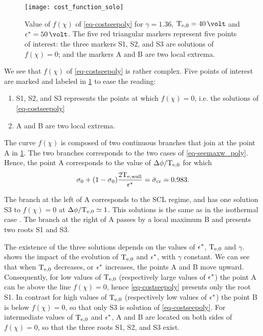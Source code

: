 \begin{figure}[!hbt]
  \centering
  \texttt{[image: cost\_function\_solo]}
  \caption{Value of $f(\chi)$ of \cref{eq-costseepoly} for $\gamma = 1.36$, $\Teb=40\,\volt$ and $\crover=50\,\volt$. The five red triangular markers represent five points of interest\string: the three markers S1, S2, and S3 are solutions of $f(\chi) = 0$; and the markers A and B are two local extrema. }
  \label{fig-costfunction}
\end{figure}

We see that $f(\chi)$ of \cref{eq-costseepoly} is rather complex.
Five points of interest are marked and labeled in \cref{fig-costfunction} to ease the reading\string: 
\begin{enumerate}
  \item S1, S2, and S3 represents the points at which $f(\chi)=0$, i.e. the solutions of  \cref{eq-costseepoly}
  \item A and B are two local extrema.
\end{enumerate}

The curve $f(\chi)$ is composed of two continuous branches that join at the point A in \cref{fig-costfunction}.
The two branches corresponds to the two cases of \cref{eq-seemaxw_poly}. Hence, the point A corresponds to the value of $\Delta \phi/\mathrm{T_{e, 0}}$ for which  \[ \sigma_0 + ( 1 - \sigma_0) \frac{ 2 \mathrm{T_{e, wall}}  }{\epsilon^{*}} =  \bar{\sigma }_{\rm cr} = 0.983. \]

The branch at the left of A corresponds to the \ac{SCL} regime, and has one solution S3 to $f(\chi)=0$ at $\Delta \phi / \mathrm{T_{e, 0}} \simeq 1$.
This solutions is the same as in the isothermal case \citep{hobbs1967}.
The branch at the right of A passes by a local maximum B and presents two roots S1 and S3.

The existence of the three solutions depends on the values of $\epsilon^{*}$, $\mathrm{T_{e, 0}}$ and $\gamma$.
 shows the impact of the evolution of $\mathrm{T_{e, 0}}$ and $\epsilon^{*}$, with $\gamma$ constant.
We can see that when $\mathrm{T_{e, 0}}$ decreases, or $\epsilon^{*}$ increases, the points A and B move upward.
Consequently, for low values of $\mathrm{T_{e, 0}}$ (respectively large values of $\epsilon^{*}$) the point A can be above the line $f(\chi) = 0$, hence  \cref{eq-costseepoly} presents only the root S1.
In contrast for high values of $\mathrm{T_{e, 0}}$ (respectively low values of $\epsilon^{*}$) the point B is below $f(\chi) = 0$, so that only S3 is solution of  \cref{eq-costseepoly}.
For intermediate values of $\mathrm{T_{e, 0}}$ and $\epsilon^{*}$, A and B are located on both sides of $f(\chi) = 0$, so that the three roots S1, S2, and S3 exist.
\renewcommand\subfigurewidth{0.47\textwidth}

